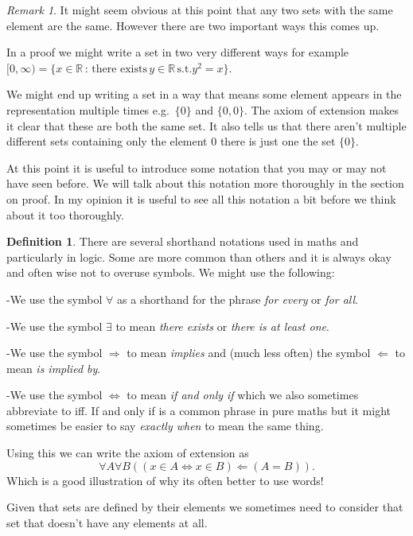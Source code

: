 \documentclass[
]{book}
\theoremstyle{definition}
\newtheorem{definition}{Definition}[chapter]
\theoremstyle{definition}
\theoremstyle{definition}
\theoremstyle{definition}
\theoremstyle{remark}
\newtheorem*{remark}{Remark}
\begin{document}
\begin{remark}
It might seem obvious at this point that any two sets with the same element are the same. However there are two important ways this comes up.

In a proof we might write a set in two very different ways for example \([0,\infty) = \{ x \in \mathbb{R} \,:\, \mbox{there exists}\, y \in \mathbb{R}\, \mbox{s.t.} y^2 = x\}\).

We might end up writing a set in a way that means some element appears in the representation multiple times e.g.~\(\{0\}\) and \(\{0, 0\}\). The axiom of extension makes it clear that these are both the same set. It also tells us that there aren't multiple different sets containing only the element \(0\) there is just one the set \(\{0\}\).
\end{remark}

At this point it is useful to introduce some notation that you may or may not have seen before. We will talk about this notation more thoroughly in the section on proof. In my opinion it is useful to see all this notation a bit before we think about it too thoroughly.

\begin{definition}
There are several shorthand notations used in maths and particularly in logic. Some are more common than others and it is always okay and often wise not to overuse symbols. We might use the following:

-We use the symbol \(\forall\) as a shorthand for the phrase \emph{for every} or \emph{for all}.

-We use the symbol \(\exists\) to mean \emph{there exists} or \emph{there is at least one}.

-We use the symbol \(\Rightarrow\) to mean \emph{implies} and (much less often) the symbol \(\Leftarrow\) to mean \emph{is implied by}.

-We use the symbol \(\Leftrightarrow\) to mean \emph{if and only if} which we also sometimes abbreviate to iff. If and only if is a common phrase in pure maths but it might sometimes be easier to say \emph{exactly when} to mean the same thing.
\end{definition}

Using this we can write the axiom of extension as
\[ \forall A \forall B ( (x \in A \Leftrightarrow x \in B) \Leftarrow (A=B)).   \] Which is a good illustration of why its often better to use words!

Given that sets are defined by their elements we sometimes need to consider that set that doesn't have any elements at all.
\end{document}

